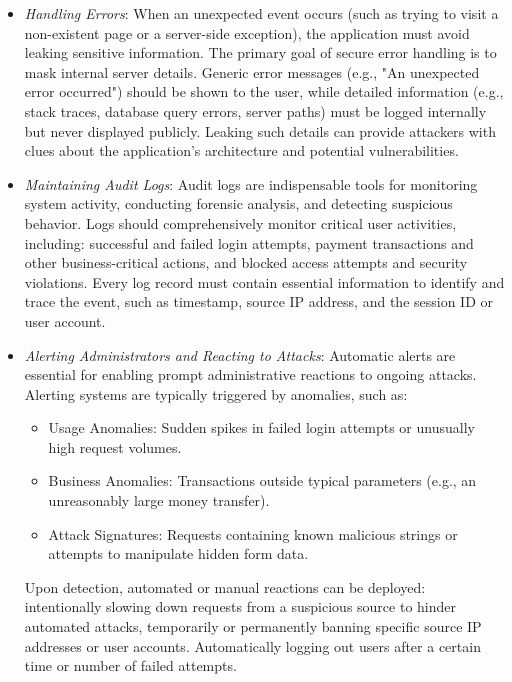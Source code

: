 \begin{itemize}
    \item \textit{Handling Errors}: When an unexpected event occurs (such as trying to visit a non-existent page or a server-side exception), the application must avoid leaking sensitive information. The primary goal of secure error handling is to mask internal server details. Generic error messages (e.g., "An unexpected error occurred") should be shown to the user, while detailed information (e.g., stack traces, database query errors, server paths) must be logged internally but never displayed publicly. Leaking such details can provide attackers with clues about the application's architecture and potential vulnerabilities.
    \item \textit{Maintaining Audit Logs}: Audit logs are indispensable tools for monitoring system activity, conducting forensic analysis, and detecting suspicious behavior. Logs should comprehensively monitor critical user activities, including: successful and failed login attempts, payment transactions and other business-critical actions, and blocked access attempts and security violations. Every log record must contain essential information to identify and trace the event, such as timestamp, source IP address, and the session ID or user account.
    \item \textit{Alerting Administrators and Reacting to Attacks}: Automatic alerts are essential for enabling prompt administrative reactions to ongoing attacks. Alerting systems are typically triggered by anomalies, such as:

          \begin{itemize}
              \item Usage Anomalies: Sudden spikes in failed login attempts or unusually high request volumes.
              \item Business Anomalies: Transactions outside typical parameters (e.g., an unreasonably large money transfer).
              \item Attack Signatures: Requests containing known malicious strings or attempts to manipulate hidden form data.
          \end{itemize}

          Upon detection, automated or manual reactions can be deployed: intentionally slowing down requests from a suspicious source to hinder automated attacks, temporarily or permanently banning specific source IP addresses or user accounts. Automatically logging out users after a certain time or number of failed attempts.


\end{itemize}
